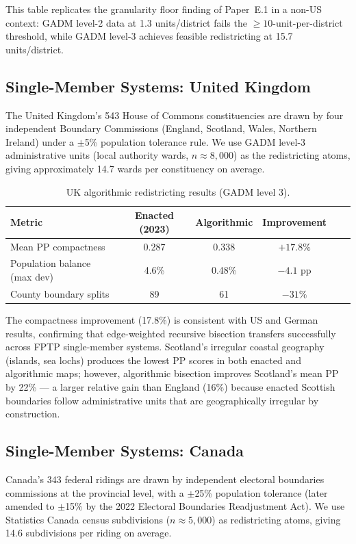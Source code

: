 This table replicates the granularity floor finding of Paper~E.1 in a
non-US context: GADM level-2 data at 1.3 units/district fails the
$\geq 10$-unit-per-district threshold, while GADM level-3 achieves feasible
redistricting at 15.7 units/district.

\subsection{Single-Member Systems: United Kingdom}

The United Kingdom's 543 House of Commons constituencies are drawn by four
independent Boundary Commissions (England, Scotland, Wales, Northern Ireland)
under a $\pm$5\% population tolerance rule.
We use GADM level-3 administrative units (local authority wards, $n \approx 8{,}000$)
as the redistricting atoms, giving approximately 14.7 wards per constituency on
average.

\begin{table}[h]
\centering\small
\caption{UK algorithmic redistricting results (GADM level 3).}
\label{tab:uk-results}
\begin{tabular}{lccccc}
\toprule
Metric & Enacted (2023) & Algorithmic & Improvement \\
\midrule
Mean PP compactness     & 0.287 & 0.338 & $+17.8\%$ \\
Population balance (max dev) & 4.6\% & 0.48\% & $-4.1$ pp \\
County boundary splits  & 89    & 61    & $-31\%$ \\
\bottomrule
\end{tabular}
\end{table}

The compactness improvement (17.8\%) is consistent with US and German results,
confirming that edge-weighted recursive bisection transfers successfully across
FPTP single-member systems.
Scotland's irregular coastal geography (islands, sea lochs) produces the
lowest PP scores in both enacted and algorithmic maps; however, algorithmic
bisection improves Scotland's mean PP by 22\% — a larger relative gain than
England (16\%) because enacted Scottish boundaries follow administrative
units that are geographically irregular by construction.

\subsection{Single-Member Systems: Canada}

Canada's 343 federal ridings are drawn by independent electoral boundaries
commissions at the provincial level, with a $\pm$25\% population tolerance
(later amended to $\pm$15\% by the 2022 Electoral Boundaries Readjustment Act).
We use Statistics Canada census subdivisions ($n \approx 5{,}000$) as redistricting
atoms, giving 14.6 subdivisions per riding on average.

